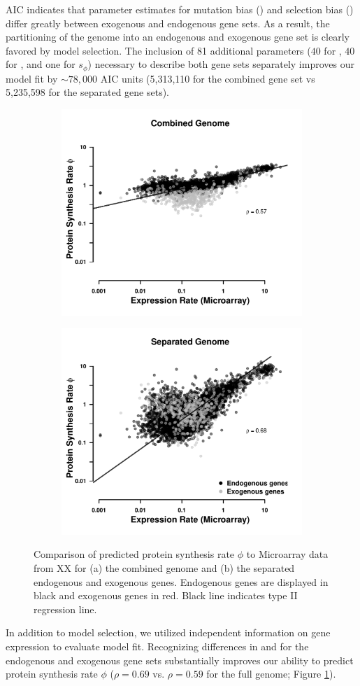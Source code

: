 \documentclass[12pt]{article}
\begin{document}
AIC indicates that parameter estimates for mutation bias (\DM) and selection bias (\DE) differ greatly between exogenous and endogenous gene sets.
As a result, the partitioning of the \kluyveri genome into an endogenous and exogenous gene set is clearly favored by model selection.
The inclusion of 81 additional parameters ($40$ for \DM, $40$ for \DE, and one for $s_{\phi}$) necessary to describe both gene sets separately improves our model fit by $\sim 78,000$ AIC units (5,313,110 for the combined gene set vs 5,235,598 for the separated gene sets).

\begin{figure}[t]
    \centering
    \begin{subfigure}
        \centering
        \includegraphics[width=.45\textwidth]{img/phi_corr_plot_whole_Genome_estim.pdf}
    \end{subfigure}
    \begin{subfigure}
        \centering
        \includegraphics[width=.45\textwidth]{img/phi_corr_plot_split_Genome_estim.pdf}
    \end{subfigure}
    \caption{Comparison of predicted protein synthesis rate $\phi$ to Microarray data from XX for (a) the combined genome and (b) the separated endogenous and exogenous genes. Endogenous genes are displayed in black and exogenous genes in red. Black line indicates type II regression line.}
    \label{fig:phi_corr_two_cond}
\end{figure}

In addition to model selection, we utilized independent information on gene expression to evaluate model fit.
Recognizing differences in \DM and \DE for the endogenous and exogenous gene sets substantially improves our ability to predict protein synthesis rate $\phi$ ($\rho = 0.69$ vs. $\rho = 0.59$ for the full genome;  Figure \ref{fig:phi_corr_two_cond}).
\end{document}
